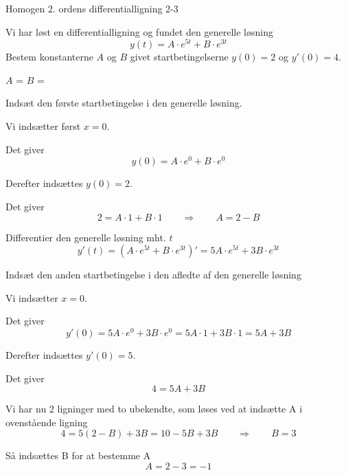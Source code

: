 \documentclass{article}
\begin{document}
\begin{exercise}{Homogen 2. ordens differentialligning 2-3}

Vi har løst en differentialligning og fundet den generelle løsning
\[
y(t) = A \cdot e^{5t} + B \cdot e^{3t}
\]
Bestem konstanterne $A$ og $B$ givet startbetingelserne $y(0)=2$ og $y'(0)=4$.


$A$ = 
$B$ = 

\hint

Indsæt den første startbetingelse i den generelle løsning.


\hint

Vi indsætter først $x=0$.

\hint

Det giver
\[
y(0)= A \cdot e^{0} + B \cdot e^{0}
\]

\hint

Derefter indsættes $y(0)=2$.

\hint

Det giver
\[
2= A \cdot 1 + B \cdot 1 \qquad \Rightarrow \qquad A = 2 - B
\]

\hint

Differentier den generelle løsning mht. $t$
\[
y'(t)= \left(A \cdot e^{5t} + B \cdot e^{3t} \right)' = 5A \cdot e^{5t} + 3B \cdot e^{3t}
\]

\hint

Indsæt den anden startbetingelse i den afledte af den generelle løsning

\hint

Vi indsætter $x=0$.

\hint

Det giver
\[
y'(0) = 5A \cdot e^{0} + 3B \cdot e^{0} = 5A \cdot 1 + 3B \cdot 1 = 5A + 3B
\]

\hint

Derefter indsættes $y'(0)=5$.
\hint

Det giver
\[
4 = 5A+ 3B
\]

\hint

Vi har nu 2 ligninger med to ubekendte, som løses ved at indsætte A i ovenstående ligning
\[
4 = 5(2 - B) + 3B = 10 - 5B + 3B \qquad \Rightarrow \qquad B = 3
\]

\hint

Så indsættes B for at bestemme A
\[
A = 2 - 3 = -1
\]

\end{exercise}

\newpage
\end{document}
